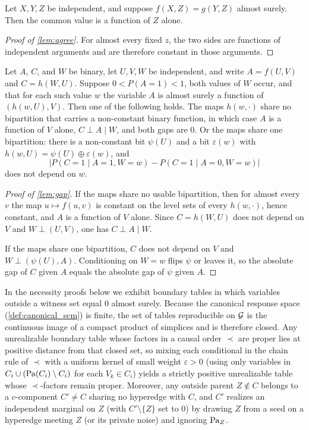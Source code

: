 \begin{lemma}[Agreement]
\label{lem:agree}
Let $X,Y,Z$ be independent, and suppose $f(X,Z)=g(Y,Z)$ almost surely. Then the common value is a function of $Z$ alone.
\end{lemma}

\begin{proof}[Proof of \cref{lem:agree}]
For almost every fixed $z$, the two sides are functions of independent arguments and are therefore constant in those arguments.
\end{proof}

\begin{lemma}
\label{lem:gap}
Let $A$, $C$, and $W$ be binary, let $U,V,W$ be independent, and write $A=f(U,V)$ and $C=h(W,U)$. Suppose $0<P(A{=}1)<1$, both values of $W$ occur, and that for each such value $w$ the variable $A$ is almost surely a function of $(h(w,U),V)$. Then one of the following holds. The maps $h(w,\cdot)$ share no bipartition that carries a non-constant binary function, in which case $A$ is a function of $V$ alone, $C\perp A\mid W$, and both gaps are $0$. Or the maps share one bipartition: there is a non-constant bit $\psi(U)$ and a bit $\varepsilon(w)$ with $h(w,U)=\psi(U)\oplus\varepsilon(w)$, and
\[
\bigl|P(C{=}1\mid A{=}1,W{=}w)-P(C{=}1\mid A{=}0,W{=}w)\bigr|
\]
does not depend on $w$.
\end{lemma}

\begin{proof}[Proof of \cref{lem:gap}]
If the maps share no usable bipartition, then for almost every $v$ the map $u\mapsto f(u,v)$ is constant on the level sets of every $h(w,\cdot)$, hence constant, and $A$ is a function of $V$ alone. Since $C=h(W,U)$ does not depend on $V$ and $W\perp(U,V)$, one has $C\perp A\mid W$.

If the maps share one bipartition, $C$ does not depend on $V$ and $W\perp(\psi(U),A)$. Conditioning on $W=w$ flips $\psi$ or leaves it, so the absolute gap of $C$ given $A$ equals the absolute gap of $\psi$ given $A$.
\end{proof}

In the necessity proofs below we exhibit boundary tables in which variables outside a witness set equal $0$ almost surely. Because the canonical response space (\cref{def:canonical_scm}) is finite, the set of tables reproducible on $\mathcal{G}$ is the continuous image of a compact product of simplices and is therefore closed. Any unrealizable boundary table whose factors in a causal order $\prec$ are proper lies at positive distance from that closed set, so mixing each conditional in the chain rule of $\prec$ with a uniform kernel of small weight $\varepsilon>0$ (using only variables in $C_i\cup(\operatorname{Pa}(C_i)\setminus C_i)$ for each $V_k\in C_i$) yields a strictly positive unrealizable table whose $\prec$-factors remain proper. Moreover, any outside parent $Z\notin C$ belongs to a $c$-component $C'\neq C$ sharing no hyperedge with $C$, and $C'$ realizes an independent marginal on $Z$ (with $C'\setminus\{Z\}$ set to $0$) by drawing $Z$ from a seed on a hyperedge meeting $Z$ (or its private noise) and ignoring $\operatorname{Pa}_Z$.


